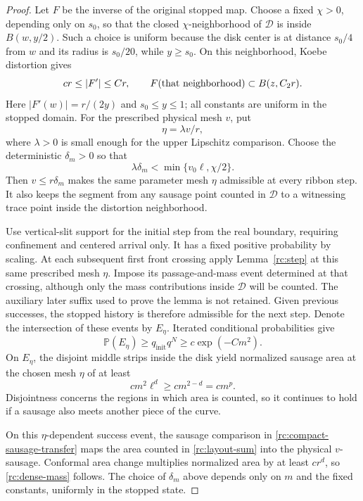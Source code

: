 \begin{proof}
Let $F$ be the inverse of the original stopped map. Choose a fixed
$\chi>0$, depending only on $s_0$, so that the closed
$\chi$-neighborhood of $\mathcal D$ is inside $B(w,y/2)$. Such a
choice is uniform because the disk center is at distance $s_0/4$
from $w$ and its radius is $s_0/20$, while $y\ge s_0$.
On this neighborhood, Koebe distortion gives
\[
 c r\le |F'|\le C r,
 \qquad F(\hbox{that neighborhood})\subset B(z,C_2r).
\]
Here $|F'(w)|=r/(2y)$ and $s_0\le y\le1$; all constants are uniform
in the stopped domain. For the prescribed physical mesh $v$, put
\[
                     \eta=\lambda v/r,
\]
where $\lambda>0$ is small enough for the upper Lipschitz comparison.
Choose the deterministic $\delta_m>0$ so that
\[
 \lambda\delta_m<\min\{v_0\ell,\chi/2\}.
\]
Then $v\le r\delta_m$ makes the same parameter mesh $\eta$ admissible
at every ribbon step. It also keeps the segment from any sausage point
counted in $\mathcal D$ to a witnessing trace point inside the
distortion neighborhood.

Use vertical-slit support for the initial step from the real boundary,
requiring confinement and centered arrival only.  It has a fixed
positive probability by scaling.  At each subsequent first front
crossing apply Lemma~\ref{rc:step} at this same prescribed mesh
$\eta$. Impose its passage-and-mass event determined at that crossing,
although only the mass contributions inside $\mathcal D$ will be
counted. The auxiliary later suffix used to prove the lemma is not
retained. Given previous successes, the stopped history is therefore
admissible for the next step. Denote the intersection of these events
by $E_\eta$.
Iterated conditional probabilities give
\[
 \mathbb P(E_\eta)\ge q_{\mathrm{init}}q^N
           \ge c\exp(-Cm^2).
\]
On $E_\eta$, the disjoint middle strips inside the disk yield
normalized sausage area at the chosen mesh $\eta$ of at least
\begin{equation}\label{rc:layout-sum}
 c m^2\ell^d\ge c m^{2-d}=c m^p.
\end{equation}
Disjointness concerns the regions in which area is counted, so it
continues to hold if a sausage also meets another piece of the curve.

On this $\eta$-dependent success event, the sausage comparison in
\eqref{rc:compact-sausage-transfer} maps the area counted in
\eqref{rc:layout-sum} into the physical $v$-sausage. Conformal area
change multiplies normalized area by at least $c r^d$, so
\eqref{rc:dense-mass} follows. The choice of $\delta_m$ above depends
only on $m$ and the fixed constants, uniformly in the stopped state.


\end{proof}
